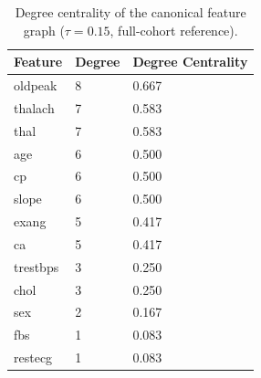 \begin{table}[t]
\centering
\caption{Degree centrality of the canonical feature graph ($\tau=0.15$, full-cohort reference).}
\label{tab:centrality}
\small
\begin{tabular}{lll}
\toprule
Feature & Degree & Degree Centrality \\
\midrule
oldpeak & 8 & 0.667 \\
thalach & 7 & 0.583 \\
thal & 7 & 0.583 \\
age & 6 & 0.500 \\
cp & 6 & 0.500 \\
slope & 6 & 0.500 \\
exang & 5 & 0.417 \\
ca & 5 & 0.417 \\
trestbps & 3 & 0.250 \\
chol & 3 & 0.250 \\
sex & 2 & 0.167 \\
fbs & 1 & 0.083 \\
restecg & 1 & 0.083 \\
\bottomrule
\end{tabular}
\end{table}
